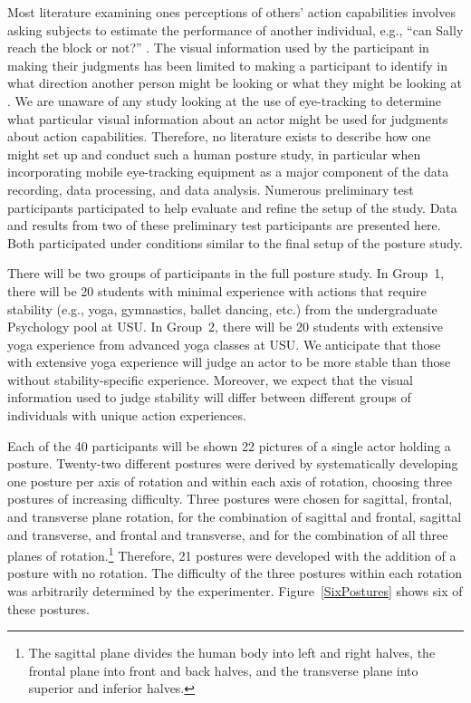 \documentclass[11pt]{asaproc}
\begin{document}
Most literature examining ones perceptions of others' action capabilities involves asking subjects to estimate
the performance of another individual, e.g., ``can Sally reach the block or not?'' \citep{Roc95}. The visual
information used by the participant in making their judgments has been limited to making a participant to
identify in what direction another person might be looking or what they might be looking at \citep{MiZa2006}. We are
unaware of any study looking at the use of eye-tracking to determine what particular visual information about an
actor might be used for judgments about action capabilities. Therefore, no literature exists to describe how
one might
set up and conduct such a human posture study, in particular when incorporating
mobile eye-tracking equipment as a major component of the data recording, data processing, and data analysis.
Numerous preliminary test participants participated to help evaluate and refine the setup of the study.
Data and results from two of these preliminary test participants are presented here. Both 
participated under conditions similar to the final setup of the posture study.

%


There will be two groups of participants in the full posture study. In Group~1, there will be 
20 students with minimal experience with actions that require stability (e.g., yoga, gymnastics, ballet dancing, etc.)
from the undergraduate Psychology pool at USU.
In Group~2, there will be 20 students with extensive yoga experience from advanced yoga classes at USU.
We anticipate that 
those with extensive yoga experience will judge an actor to be more stable than those without stability-specific experience.
Moreover, we expect that the visual information used to judge stability will differ between different groups of individuals with 
unique action experiences.

Each of the 40 participants will be shown 22 pictures of a single actor holding a posture.
Twenty-two different postures were derived by systematically developing one posture per axis of rotation and
within each axis of rotation, choosing three postures of increasing difficulty. Three postures were chosen for
sagittal, frontal, and transverse plane rotation, for the combination of sagittal and frontal, sagittal and transverse,
and frontal and transverse, and for the combination of all three planes of rotation.\footnote{The sagittal plane 
divides the human body into left and right halves, the frontal plane into front and back halves,
and the transverse plane into superior and inferior halves.}
Therefore, 21 postures were
developed with the addition of a posture with no rotation. The difficulty of the three postures within each
rotation was arbitrarily determined by the experimenter.
Figure~\ref{SixPostures} shows six of these postures.
\end{document}
